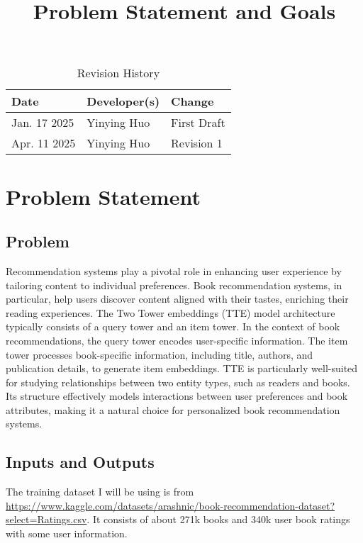 \documentclass{article}
\title{Problem Statement and Goals\\\progname}
\author{\authname}
\date{}
\begin{document}
\maketitle

\begin{table}[hp]
\caption{Revision History} \label{TblRevisionHistory}
\begin{tabularx}{\textwidth}{llX}
\toprule
\textbf{Date} & \textbf{Developer(s)} & \textbf{Change}\\
\midrule
Jan. 17 2025 & Yinying Huo & First Draft \\
Apr. 11 2025 & Yinying Huo & Revision 1\\
\bottomrule
\end{tabularx}
\end{table}

\section{Problem Statement}

\subsection{Problem}
Recommendation systems play a pivotal role in enhancing user experience by tailoring content to individual preferences. Book recommendation systems, in particular, help users discover content aligned with their tastes, enriching their reading experiences. The Two Tower embeddings (TTE) model architecture typically consists of a query tower and an item tower. In the context of book recommendations, the query tower encodes user-specific information. The item tower processes book-specific information, including title, authors, and publication details, to generate item embeddings. TTE is particularly well-suited for studying relationships between two entity types, such as readers and books. Its structure effectively models interactions between user preferences and book attributes, making it a natural choice for personalized book recommendation systems.

\subsection{Inputs and Outputs}

The training dataset I will be using is from \url{https://www.kaggle.com/datasets/arashnic/book-recommendation-dataset?select=Ratings.csv}. It consists of about 271k books and 340k user book ratings with some user information.
\end{document}
